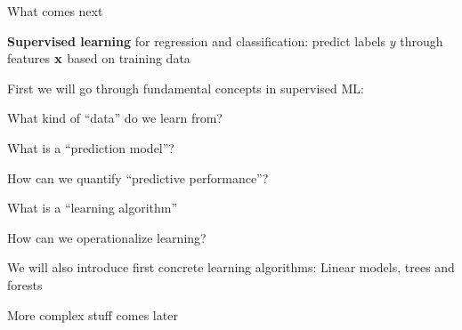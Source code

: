 \documentclass[11pt,compress,t,notes=noshow, xcolor=table]{beamer}
\begin{document}
\begin{framei}{What comes next}
\item \textbf{Supervised learning} for regression and classification: predict labels $y$ through features $\mathbf{x}$ based on training data
\item First we will go through fundamental concepts in supervised ML: 
\begin{itemizeL}
\item What kind of ``data'' do we learn from?
\item What is a ``prediction model''?
\item How can we quantify ``predictive performance''?
\item What is a ``learning algorithm'' 
\item How can we operationalize learning?
\end{itemizeL}
\item We will also introduce first concrete learning algorithms: Linear models, trees and forests
\item More complex stuff comes later
\end{framei}

\endlecture
\end{document}
